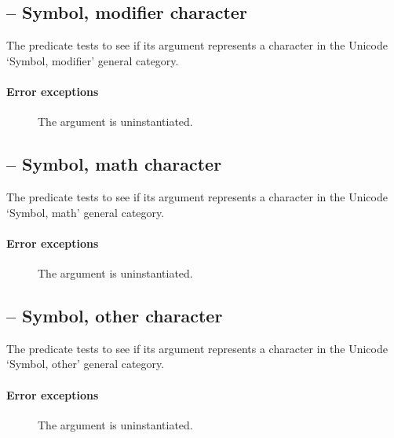 \subsection{ -- Symbol, modifier character}
\label{chars:isSkChar}

The  predicate tests to see if its  argument represents a character in the Unicode `Symbol, modifier' general category. 
        
\paragraph{Error exceptions}
\begin{description}
\item[]
The argument is uninstantiated.
\end{description}

\subsection{ -- Symbol, math character}
\label{chars:isSmChar}

The  predicate tests to see if its  argument represents a character in the Unicode `Symbol, math' general category. 
        
\paragraph{Error exceptions}
\begin{description}
\item[]
The argument is uninstantiated.
\end{description}

\subsection{ -- Symbol, other character}
\label{chars:isSoChar}

The  predicate tests to see if its  argument represents a character in the Unicode `Symbol, other' general category. 
        
\paragraph{Error exceptions}
\begin{description}
\item[]
The argument is uninstantiated.
\end{description}

